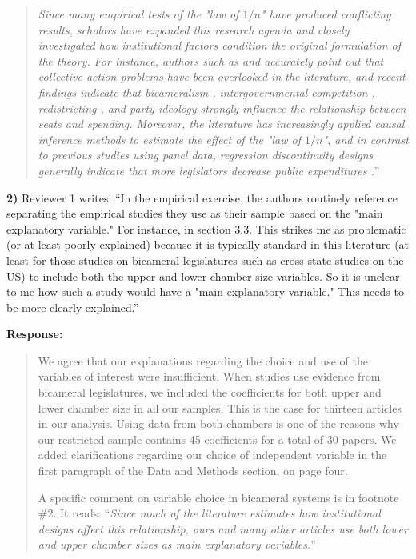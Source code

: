 \documentclass[a4paper,12pt]{article}
\begin{document}
\begin{quote}
    \textit{Since many empirical tests of the "law of $1/n$" have produced conflicting results, scholars have expanded this research agenda and closely investigated how institutional factors condition the original formulation of the theory. For instance, authors such as \citet{crowley2019law} and \citet{pecorino2018supermajority} accurately point out that collective action problems have been overlooked in the literature, and recent findings indicate that bicameralism \citep{maldonado2013legislatures}, intergovernmental competition \citep{crowley2015local}, redistricting \citep{lee2018court}, and party ideology \citep{bjedov2014impact} strongly influence the relationship between seats and spending. Moreover, the literature has increasingly applied causal inference methods to estimate the effect of the "law of $1/n$", and in contrast to previous studies using panel data, regression discontinuity designs generally indicate that more legislators decrease public expenditures \citep{debenedetto2018effect, hohmann2017effect, lewis2019legislature, petterssonlidbom2012size}.}''
\end{quote}

\vspace{.3cm}

\noindent \textbf{2)} Reviewer 1 writes: ``In the empirical exercise, the authors routinely reference separating the empirical studies they use as their sample based on the "main explanatory variable." For instance, in section 3.3. This strikes me as problematic (or at least poorly explained) because it is typically standard in this literature (at least for those studies on bicameral legislatures such as cross-state studies on the US) to include both the upper and lower chamber size variables. So it is unclear to me how such a study would have a "main explanatory variable." This needs to be more clearly explained.''

\vspace{.3cm}

\noindent \textbf{Response:} 
\begin{quote}
    We agree that our explanations regarding the choice and use of the variables of interest were insufficient. When studies use evidence from bicameral legislatures, we included the coefficients for both upper and lower chamber size in all our samples. This is the case for thirteen articles in our analysis. Using data from both chambers is one of the reasons why our restricted sample contains 45 coefficients for a total of 30 papers. We added clarifications regarding our choice of independent variable in the first paragraph of the Data and Methods section, on page four.
    
    A specific comment on variable choice in bicameral systems is in footnote \#2. It reads: ``\textit{Since much of the literature estimates how institutional designs affect this relationship, ours and many other articles use both lower and upper chamber sizes as main explanatory variables.}''
\end{quote}
\end{document}

